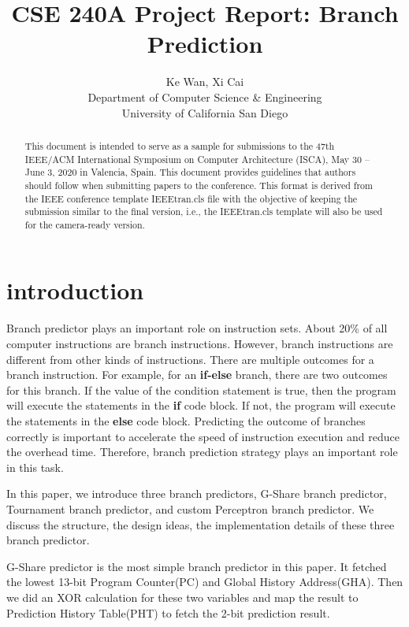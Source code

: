 \documentclass[conference]{IEEEtran}
\title{CSE 240A Project Report: Branch Prediction}
\author{Ke Wan, Xi Cai \\
Department of Computer Science \& Engineering \\
University of California San Diego

}
\begin{document}
\maketitle
\thispagestyle{firstpage}
\pagestyle{plain}




\begin{abstract}

This document is intended to serve as a sample for submissions to the
47th IEEE/ACM International Symposium on Computer Architecture (ISCA),
May 30 -- June 3, 2020 in Valencia, Spain. This document provides
guidelines that authors should follow when submitting papers to the
conference.  This format is derived from the IEEE conference template IEEEtran.cls
file with the objective of keeping the submission similar to the final
version, i.e., the IEEEtran.cls template will also be used for
  the camera-ready version.

\end{abstract}

\section{introduction}
Branch predictor plays an important role on instruction sets. About 20\% of all computer instructions are branch instructions. However, branch instructions are
different from other kinds of instructions. There are multiple outcomes for a branch instruction. For example, for an \textbf{if-else} branch, there are two outcomes for this branch. 
If the value of the condition statement is true, then the program will execute the statements in the \textbf{if} code block. If not, the program will execute the statements
in the \textbf{else} code block. Predicting the outcome of branches correctly is important to accelerate the speed of instruction execution and reduce the overhead time. Therefore, branch
prediction strategy plays an important role in this task. 

In this paper, we introduce three branch predictors, G-Share branch predictor, Tournament branch
predictor, and custom Perceptron branch predictor. We discuss the structure, the design ideas, the implementation details of these three branch predictor.

G-Share predictor is the most simple branch predictor in this paper. It fetched the lowest 13-bit Program Counter(PC) and Global History Address(GHA). Then we did an XOR calculation for these two variables
and map the result to Prediction History Table(PHT) to fetch the 2-bit prediction result. 
\end{document}
